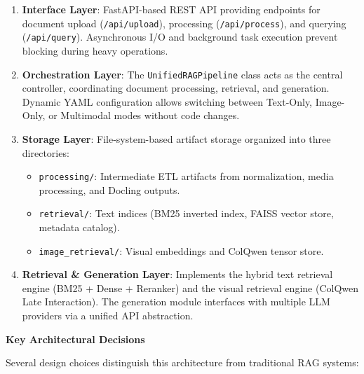 \begin{enumerate}
    \item \textbf{Interface Layer}: FastAPI-based REST API providing endpoints for document upload (\texttt{/api/upload}), processing (\texttt{/api/process}), and querying (\texttt{/api/query}). Asynchronous I/O and background task execution prevent blocking during heavy operations.
    
    \item \textbf{Orchestration Layer}: The \texttt{UnifiedRAGPipeline} class acts as the central controller, coordinating document processing, retrieval, and generation. Dynamic YAML configuration allows switching between Text-Only, Image-Only, or Multimodal modes without code changes.
    
    \item \textbf{Storage Layer}: File-system-based artifact storage organized into three directories:
    \begin{itemize}
        \item \texttt{processing/}: Intermediate ETL artifacts from normalization, media processing, and Docling outputs.
        \item \texttt{retrieval/}: Text indices (BM25 inverted index, FAISS vector store, metadata catalog).
        \item \texttt{image\_retrieval/}: Visual embeddings and ColQwen tensor store.
    \end{itemize}
    
    \item \textbf{Retrieval \& Generation Layer}: Implements the hybrid text retrieval engine (BM25 + Dense + Reranker) and the visual retrieval engine (ColQwen Late Interaction). The generation module interfaces with multiple LLM providers via a unified API abstraction.
\end{enumerate}

\textbf{Key Architectural Decisions}

Several design choices distinguish this architecture from traditional RAG systems:

